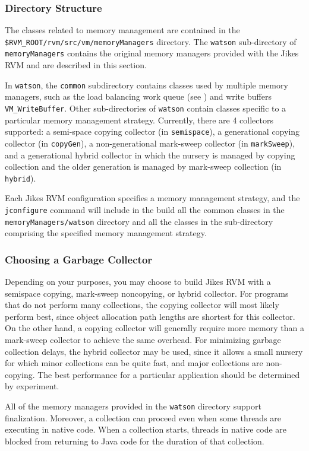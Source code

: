 \subsubsection{Directory Structure} 
The classes related to memory management are contained in the 
{\tt \$RVM\_ROOT/rvm/src/vm/memoryManagers}  directory.
The  {\tt watson}  sub-directory of  {\tt memoryManagers}  contains
the original memory managers provided with the Jikes RVM
and are described in this section.  

In {\tt watson}, the {\tt common} subdirectory contains classes used by multiple
memory managers, such as the load balancing work queue
(see )
and write buffers {\tt VM\_WriteBuffer}.
Other sub-directories of {\tt watson} 
contain classes specific to a particular memory management strategy.
Currently, there are 4 collectors supported: 
a semi-space copying collector (in {\tt semispace}),
a generational copying collector (in {\tt copyGen}), 
a non-generational mark-sweep collector (in {\tt markSweep}), 
and a generational hybrid collector in which the nursery is managed by copying collection
and the older generation is managed by mark-sweep collection (in {\tt hybrid}).

Each Jikes RVM configuration specifies a memory management strategy, 
and the  {\tt jconfigure}   command will include in the build all the
common classes in the {\tt memoryManagers/watson} directory and 
all the classes in the sub-directory comprising the specified memory management strategy.

\subsubsection{Choosing a Garbage Collector}
Depending on your purposes, you may choose to build Jikes RVM with a
semispace copying, mark-sweep noncopying, or hybrid collector.  For
programs that do not perform many collections, the copying collector
will most likely perform best, since object allocation path lengths
are shortest for this collector.  On the other hand, a copying
collector will generally require more memory than a mark-sweep
collector to achieve the same overhead. For minimizing garbage
collection delays, the hybrid collector may be used, since it allows a
small nursery for which minor collections can be quite fast, and major
collections are non-copying.  The best performance for a particular
application should be determined by experiment.

All of the memory managers provided in the {\tt watson} directory
support finalization.  Moreover, a collection can proceed even 
when some threads are executing in native code. When a collection 
starts, threads in native code are blocked from returning to Java code
for the duration of that collection.

